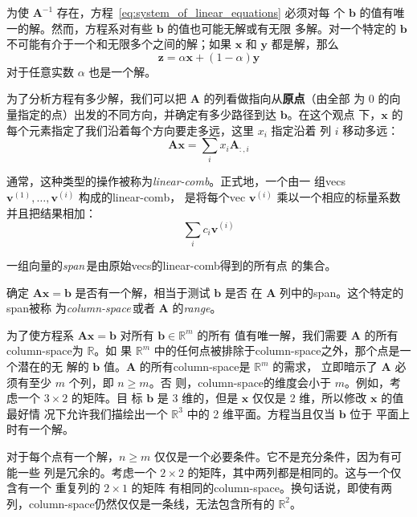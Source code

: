 为使 $\pmb{A}^{-1}$ 存在，方程~\ref{eq:system_of_linear_equations} 必须对每
个 $\pmb{b}$ 的值有唯一的解。然而，方程系对有些 $\pmb{b}$ 的值也可能无解或有无限
多解。对一个特定的 $\pmb{b}$ 不可能有介于一个和无限多个之间的解；如果 $\pmb{x}$
和 $\pmb{y}$ 都是解，那么
\begin{equation}
  \pmb{z} = \alpha\pmb{x} + (1 - \alpha)\pmb{y}
\end{equation}
对于任意实数 $\alpha$ 也是一个解。

为了分析方程有多少解，我们可以把 $\pmb{A}$ 的列看做指向从\textbf{原点}（由全部
为 $0$ 的向量指定的点）出发的不同方向，并确定有多少路径到达 $\pmb{b}$。在这个观点
下，$\pmb{x}$ 的每个元素指定了我们沿着每个方向要走多远，这里 $x_i$ 指定沿着
列 $i$ 移动多远：
\begin{equation}
  \pmb{A}\pmb{x} = \sum_{i}x_i\pmb{A}_{:,i}
\end{equation}

通常，这种类型的操作被称为\emph{\gls{linear-comb}}。正式地，一个由一
组\gls*{vecs} ${\pmb{v}^{(1)}, \ldots, \pmb{v}^{(i)}}$ 构成的\gls*{linear-comb}，
是将每个\gls*{vec} $\pmb{v}^{(i)}$ 乘以一个相应的标量系数并且把结果相加：
\begin{equation}
  \sum_{i}c_i\pmb{v}^{(i)}
\end{equation}

一组向量的\emph{\gls{span}}\,是由原始\gls*{vecs}的\gls*{linear-comb}得到的所有点
的集合。

确定 $\pmb{A}\pmb{x} = \pmb{b}$ 是否有一个解，相当于测试 $\pmb{b}$ 是否
在 $\pmb{A}$ 列中的\gls*{span}。这个特定的\gls*{span}被称
为\emph{\gls{column-space}}\,或者 $\pmb{A}$ 的\emph{\gls{range}}。

为了使方程系 $\pmb{A}\pmb{x} = \pmb{b}$ 对所有 $\pmb{b} \in \mathbb{R}^m$ 的所有
值有唯一解，我们需要 $\pmb{A}$ 的所有\gls*{column-space}为 $\mathbb{R}$。如
果 $\mathbb{R}^m$ 中的任何点被排除于\gls*{column-space}之外，那个点是一个潜在的无
解的 $\pmb{b}$ 值。$\pmb{A}$ 的所有\gls*{column-space}是 $\mathbb{R}^m$ 的需求，
立即暗示了 $\pmb{A}$ 必须有至少 $m$ 个列，即 $n \geq m$。否
则，\gls*{column-space}的维度会小于 $m$。例如，考虑一个 $3 \times 2$ 的矩阵。目
标 $\pmb{b}$ 是 3 维的，但是 $\pmb{x}$ 仅仅是 2 维，所以修改 $\pmb{x}$ 的值最好情
况下允许我们描绘出一个 $\mathbb{R}^3$ 中的 2 维平面。方程当且仅当 $\pmb{b}$ 位于
平面上时有一个解。

对于每个点有一个解，$n \geq m$ 仅仅是一个必要条件。它不是充分条件，因为有可能一些
列是冗余的。考虑一个 $2 \times 2$ 的矩阵，其中两列都是相同的。这与一个仅含有一个
重复列的 $2 \times 1$ 的矩阵 有相同的\gls*{column-space}。换句话说，即使有两
列，\gls*{column-space}仍然仅仅是一条线，无法包含所有的 $\mathbb{R}^2$。

